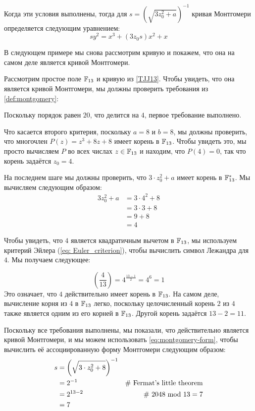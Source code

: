 Когда эти условия выполнены, тогда для $s=({\sqrt{3z_0^{2}+a}})^{-1}$ кривая Монтгомери определяется следующим уравнением:
\begin{equation}\label{eq:montgomery-form}
sy^{2}=x^{3}+(3z_0 s)x^{2}+x
\end{equation}

В следующем примере мы снова рассмотрим кривую  и покажем, что она на самом деле является кривой Монтгомери.
\begin{example}\label{TJJ13-montgomery}
Рассмотрим простое поле $\mathbb{F}_{13}$ и кривую  \TJJ{} из \examplename{} \ref{TJJ13}. Чтобы увидеть, что она является кривой Монтгомери, мы должны проверить требования из  \ref{def:montgomery}: 

Поскольку порядок \TJJ{} равен $20$, что делится на $4$, первое требование выполнено.

Что касается второго критерия, поскольку $a=8$ и $b=8$, мы должны проверить, что многочлен $P(z) = z^3 + 8z + 8$ имеет корень в $\mathbb{F}_{13}$. Чтобы увидеть это, мы просто вычисляем $P$ во всех числах $z\in \mathbb{F}_{13}$ и находим, что $P(4)=0$, так что корень задаётся $z_0=4$. 

На последнем шаге мы должны проверить, что $3\cdot z_0^2 + a$ имеет корень в $\mathbb{F}_{13}^*$. Мы вычисляем следующим образом:
\begin{align*}
3z_0^2 + a & = 3\cdot 4^2 + 8 \\
           & = 3 \cdot 3 + 8 \\
           & = 9 + 8 \\
           & = 4
\end{align*}

Чтобы увидеть, что $4$ является квадратичным вычетом в $\mathbb{F}_{13}$, мы используем критерий Эйлера (\ref{eq: Euler_criterion}), чтобы вычислить символ Лежандра для $4$. Мы получаем следующее:

$$
\left(\frac{4}{13}\right) = 4^{\frac{13-1}{2}} = 4^6 = 1
$$ 
Это означает, что $4$ действительно имеет корень в $\mathbb{F}_{13}$. На самом деле, вычисление корня из $4$ в $\mathbb{F}_{13}$ легко, поскольку целочисленный корень $2$ из $4$ также является одним из его корней в $\mathbb{F}_{13}$. Другой корень задаётся $13-2=11$.

Поскольку все требования выполнены, мы показали, что \TJJ{} действительно является кривой Монтгомери, и мы можем использовать \eqref{eq:montgomery-form}, чтобы вычислить её ассоциированную форму Монтгомери следующим образом:
\begin{align*}
s & = \left(\sqrt{3\cdot z_0^2 +8}\right)^{-1} \\
  & = 2^{-1} & \text{\# Fermat's little theorem} \\
  & = 2^{13-2} & \text{\# }2048 \text{ mod } 13 = 7\\
  & = 7
\end{align*}


\end{example}

